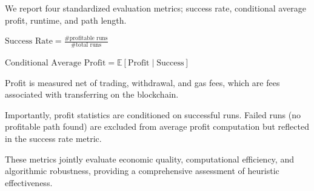 We report four standardized evaluation metrics; success rate, conditional average profit, runtime, and path length. 

$
\text{Success Rate} =
\frac{\text{\# profitable runs}}{\text{\# total runs}} 
$


$\text{Conditional Average Profit} = \mathbb{E}[\text{Profit} \mid \text{Success}]
$

Profit is measured net of trading, withdrawal, and gas fees, which are fees associated with transferring on the blockchain.

Importantly, profit statistics are conditioned on successful runs.
Failed runs (no profitable path found) are excluded from average
profit computation but reflected in the success rate metric.

These metrics jointly evaluate economic quality, computational efficiency,
and algorithmic robustness, providing a comprehensive assessment of
heuristic effectiveness.
